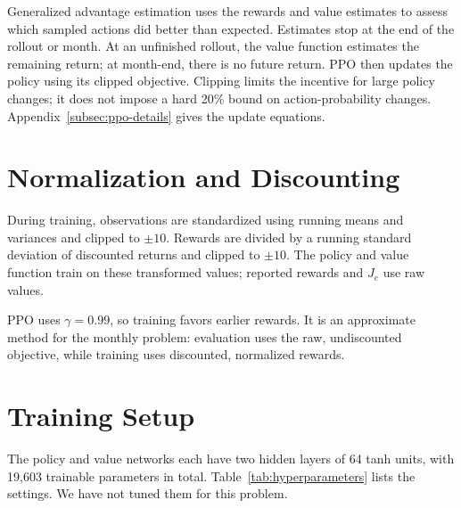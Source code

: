 \documentclass{UNCC-thesis}
\begin{document}
Generalized advantage estimation \cite{schulman2016gae} uses the rewards
and value estimates to assess which sampled actions did better than
expected. Estimates stop at the end of the rollout or month. At an
unfinished rollout, the value function estimates the remaining return;
at month-end, there is no future return. PPO then updates the policy using
its clipped objective. Clipping limits the incentive for large policy
changes; it does not impose a hard 20\% bound on action-probability changes.
Appendix~\ref{subsec:ppo-details} gives the update equations.

\section{Normalization and Discounting}

During training, observations are standardized using running means and
variances and clipped to \(\pm10\). Rewards are divided by a running
standard deviation of discounted returns and clipped to \(\pm10\).
The policy and value function train on these transformed values; reported
rewards and \(J_e\) use raw values.

PPO uses \(\gamma=0.99\), so training favors earlier rewards. It is an
approximate method for the monthly problem: evaluation uses the raw,
undiscounted objective, while training uses discounted, normalized rewards.

\section{Training Setup}

The policy and value networks each have two hidden layers of 64 tanh units,
with 19,603 trainable parameters in total. Table~\ref{tab:hyperparameters}
lists the settings. We have not tuned them for this problem.
\end{document}
